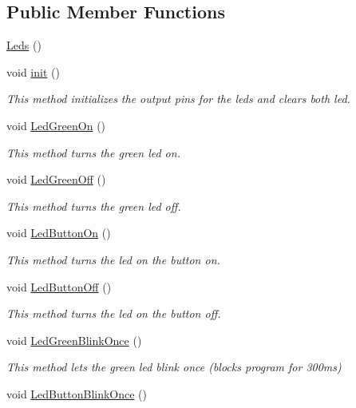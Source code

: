 \subsection*{Public Member Functions}
\begin{DoxyCompactItemize}
\item 
\hyperlink{class_leds_a240103486293e11969e1260e96fd6801}{Leds} ()
\item 
void \hyperlink{class_leds_a343c2d2ef1ea2060351dc51a4340fbec}{init} ()
\begin{DoxyCompactList}\small\item\em This method initializes the output pins for the leds and clears both led. \end{DoxyCompactList}\item 
void \hyperlink{class_leds_a0f2d6c3b835457eac3e6201d03174e78}{Led\+Green\+On} ()
\begin{DoxyCompactList}\small\item\em This method turns the green led on. \end{DoxyCompactList}\item 
void \hyperlink{class_leds_a7330a7a45cf40e4dc9b72a1ac745aa16}{Led\+Green\+Off} ()
\begin{DoxyCompactList}\small\item\em This method turns the green led off. \end{DoxyCompactList}\item 
void \hyperlink{class_leds_ac57ffee4cd4c4dfa5ae59d272be9fff0}{Led\+Button\+On} ()
\begin{DoxyCompactList}\small\item\em This method turns the led on the button on. \end{DoxyCompactList}\item 
void \hyperlink{class_leds_ade51287af3bee08008bd355f2c18c649}{Led\+Button\+Off} ()
\begin{DoxyCompactList}\small\item\em This method turns the led on the button off. \end{DoxyCompactList}\item 
void \hyperlink{class_leds_a52430ba19085c90a65454ba297c101cb}{Led\+Green\+Blink\+Once} ()
\begin{DoxyCompactList}\small\item\em This method lets the green led blink once (blocks program for 300ms) \end{DoxyCompactList}\item 
void \hyperlink{class_leds_a5dd629b0da04c13f39a9bb5e976a8a80}{Led\+Button\+Blink\+Once} ()

\end{DoxyCompactItemize}
